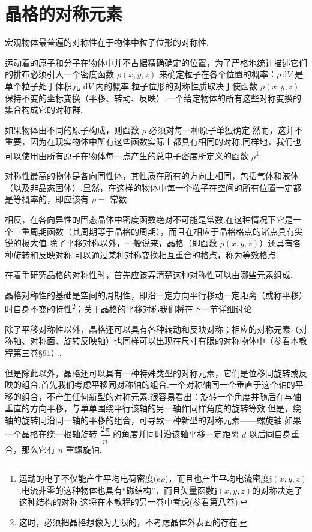 \section{晶格的对称元素}

宏观物体最普遍的对称性在于物体中粒子位形的对称性.

运动着的原子和分子在物体中并不占据精确确定的位置，为了严格地统计描述它们的排布必须引入一个密度函数 $\rho(x,y,z)$ 来确定粒子在各个位置的概率：$\rho\,\mathrm{d}V$ 是单个粒子处于体积元 $\mathrm{d}V$ 内的概率.粒子位形的对称性质取决于使函数 $\rho(x,y,z)$ 保持不变的坐标变换（平移、转动、反映）.一个给定物体的所有这些对称变换的集合构成它的对称群.

如果物体由不同的原子构成，则函数 $\rho$ 必须对每一种原子单独确定.然而，这并不重要，因为在现实物体中所有这些函数实际上都具有相同的对称.同样地，我们也可以使用由所有原子在物体每一点产生的总电子密度所定义的函数 $\rho$\footnote{运动的电子不仅能产生平均电荷密度($e\rho$)，而且也产生平均电流密度$\boldsymbol{j}(x,y,z)$.电流非零的这种物体也具有“磁结构”，而且矢量函数$\boldsymbol{j}(x,y,z)$的对称决定了这种结构的对称.这将在本教程的另一卷中考虑(参看第八卷).}.

对称性最高的物体是各向同性体，其性质在所有的方向上相同，包括气体和液体（以及非晶态固体）.显然，在这样的物体中每一个粒子在空间的所有位置一定都是等概率的，即应该有 $\rho=$ 常数.

相反，在各向异性的固态晶体中密度函数绝对不可能是常数.在这种情况下它是一个三重周期函数（其周期等于晶格的周期），而且在相应于晶格格点的诸点具有尖锐的极大值.除了平移对称以外，一般说来，晶格（即函数 $\rho(x,y,z)$）还具有各种旋转和反映对称.可以通过某种对称变换相互重合的格点，称为等效格点.

在着手研究晶格的对称性时，首先应该弄清楚这种对称性可以由哪些元素组成.

晶格对称性的基础是空间的周期性，即沿一定方向平行移动一定距离（或称平移）时自身不变的特性\footnote{这时，必须把晶格想像为无限的，不考虑晶体外表面的存在.}；关于晶格的平移对称我们将在下一节详细讨论.

除了平移对称性以外，晶格还可以具有各种转动和反映对称；相应的对称元素（对称轴、对称面、旋转反映轴）也同样可以出现在尺寸有限的对称物体中（参看本教程第三卷§91）.

但是除此以外，晶格还可以具有一种特殊类型的对称元素，它们是位移同旋转或反映的组合.首先我们考虑平移同对称轴的组合.一个对称轴同一个垂直于这个轴的平移的组合，不产生任何新型的对称元素.很容易看出：旋转一个角度并随后在与轴垂直的方向平移，与单单围绕平行该轴的另一轴作同样角度的旋转等效.但是，绕轴的旋转同沿同一轴的平移的组合，可导致一种新型的对称元素——螺旋轴.如果一个晶格在绕一根轴旋转 $\dfrac{2\pi}{n}$ 的角度并同时沿该轴平移一定距离 $d$ 以后同自身重合，那么它有 $n$ 重螺旋轴.

